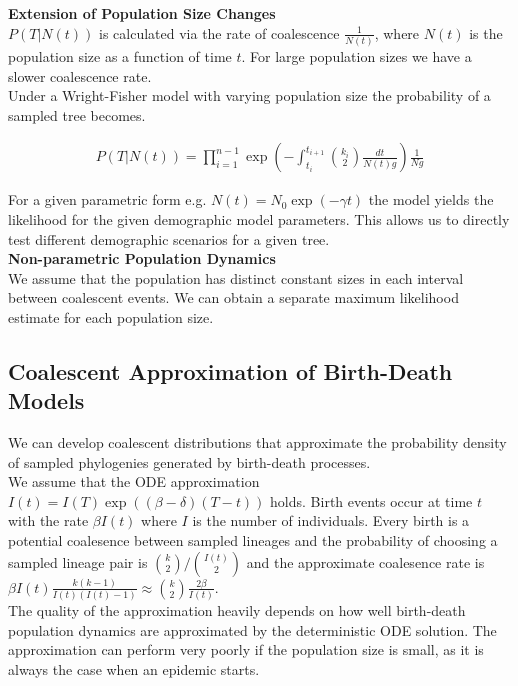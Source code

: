 \documentclass{article}
\begin{document}
\begin{multicols*}{3}
\textbf{Extension of Population Size Changes}\\

$P(T|N(t))$ is calculated via the rate of coalescence $\frac{1}{N(t)}$, where $N(t)$ is the population size as a function of time $t$. For large population sizes we have a slower coalescence rate.\\

Under a Wright-Fisher model with varying population size the probability of a sampled tree becomes. 

\begin{align*}
    P(T|N(t)) = \prod _{i = 1}^{n-1}\exp \left(-\int_{t_i}^{t_{i+1}}{k_i \choose 2}\frac{dt}{N(t)g}\right)\frac{1}{Ng}
\end{align*}

For a given parametric form e.g. $N(t) = N_0\exp(-\gamma t)$ the model yields the likelihood for the given demographic model parameters. This allows us to directly test different demographic scenarios for a given tree.\\

\textbf{Non-parametric Population Dynamics}\\
We assume that the population has distinct constant sizes in each interval between coalescent events. We can obtain a separate maximum likelihood estimate for each population size. 

\subsection{Coalescent Approximation of Birth-Death Models}

We can develop coalescent distributions that approximate the probability density of sampled phylogenies generated by birth-death processes.\\

We assume that the ODE approximation $I(t) = I(T)\exp((\beta -\delta)(T-t))$ holds. Birth events occur at time $t$ with the rate $\beta I(t)$ where $I$ is the number of individuals. Every birth is a potential coalesence between sampled lineages and the probability of choosing a sampled lineage pair is ${k \choose 2}/{I(t)\choose 2}$ and the approximate coalesence rate is $\beta I(t) \frac{k(k-1)}{I(t)(I(t)-1)}\approx {k \choose 2}\frac{2\beta}{I(t)}$.\\

The quality of the approximation heavily depends on how well birth-death population dynamics are approximated by the deterministic ODE solution. The approximation can perform very poorly if the population size is small, as it is always the case when an epidemic starts. 


\end{multicols*}
\end{document}
